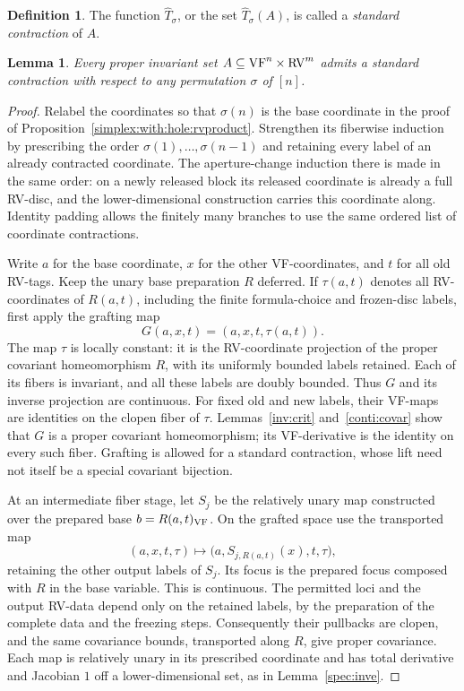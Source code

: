 \documentclass[12pt]{amsart}
\newcommand{\memph}[1]{{\color{magenta}\emph{#1}}}
\theoremstyle{plain}
\newtheorem{lem}[thm]{Lemma}
\theoremstyle{definition}
\newtheorem{defn}[thm]{Definition}
\theoremstyle{remark}
\numberwithin{equation}{section}
\theoremstyle{plain}
\newcommand{\VF}{\textup{VF}}
\newcommand{\RV}{\textup{RV}}
\newcommand{\0}{\emptyset}
\newcommand{\sub}{\subseteq}
\begin{document}
\begin{defn}\label{defn:standard:contraction}
The function $\hat T_{\sigma}$, or the set $\hat T_{\sigma}(A)$, is called a \memph{standard contraction} of  $A$.
\end{defn}


\begin{lem}\label{exit:stand}
Every proper invariant set $A \sub \VF^{n} \times \RV^{m}$  admits a standard contraction with respect to any permutation $\sigma$ of $[n]$.
\end{lem}
\begin{proof}
Relabel the coordinates so that $\sigma(n)$ is the base coordinate in the proof of Proposition~\ref{simplex:with:hole:rvproduct}. Strengthen its fiberwise induction by prescribing the order $\sigma(1),\ldots,\sigma(n-1)$ and retaining every label of an already contracted coordinate. The aperture-change induction there is made in the same order: on a newly released block its released coordinate is already a full RV-disc, and the lower-dimensional construction carries this coordinate along. Identity padding allows the finitely many branches to use the same ordered list of coordinate contractions.

Write $a$ for the base coordinate, $x$ for the other VF-coordinates, and $t$ for all old RV-tags. Keep the unary base preparation $R$ deferred. If $\tau(a,t)$ denotes all RV-coordinates of $R(a,t)$, including the finite formula-choice and frozen-disc labels, first apply the grafting map
\[
G(a,x,t)=(a,x,t,\tau(a,t)).
\]
The map $\tau$ is locally constant: it is the RV-coordinate projection of the proper covariant homeomorphism $R$, with its uniformly bounded labels retained. Each of its fibers is invariant, and all these labels are doubly bounded. Thus $G$ and its inverse projection are continuous. For fixed old and new labels, their VF-maps are identities on the clopen fiber of $\tau$. Lemmas~\ref{inv:crit} and~\ref{conti:covar} show that $G$ is a proper covariant homeomorphism; its VF-derivative is the identity on every such fiber. Grafting is allowed for a standard contraction, whose lift need not itself be a special covariant bijection.

At an intermediate fiber stage, let $S_j$ be the relatively unary map constructed over the prepared base $b=R(a,t)_{\VF}$. On the grafted space use the transported map
\[
(a,x,t,\tau)\longmapsto
\bigl(a,S_{j,R(a,t)}(x),t,\tau\bigr),
\]
retaining the other output labels of $S_j$. Its focus is the prepared focus composed with $R$ in the base variable. This is continuous. The permitted loci and the output RV-data depend only on the retained labels, by the preparation of the complete data and the freezing steps. Consequently their pullbacks are clopen, and the same covariance bounds, transported along $R$, give proper covariance. Each map is relatively unary in its prescribed coordinate and has total derivative and Jacobian $1$ off a lower-dimensional set, as in Lemma~\ref{spec:inve}.


\end{proof}
\end{document}
